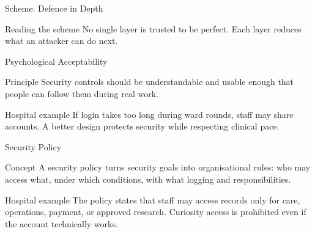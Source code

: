 \documentclass[presentation]{beamer}
\begin{document}
\begin{frame}[c]{Scheme: Defence in Depth}
\begin{center}
\end{center}

\begin{block}{Reading the scheme}
No single layer is trusted to be perfect. Each layer reduces what an attacker can do next.
\end{block}
\end{frame}

\begin{frame}[c]{Psychological Acceptability}
\begin{block}{Principle}
Security controls should be understandable and usable enough that people can follow them during
real work.
\end{block}

\begin{exampleblock}{Hospital example}
If login takes too long during ward rounds, staff may share accounts. A better design protects
security while respecting clinical pace.
\end{exampleblock}
\end{frame}

\begin{frame}[c]{Security Policy}
\begin{block}{Concept}
A security policy turns security goals into organisational rules: who may access what, under
which conditions, with what logging and responsibilities.
\end{block}

\begin{exampleblock}{Hospital example}
The policy states that staff may access records only for care, operations, payment, or approved
research. Curiosity access is prohibited even if the account technically works.
\end{exampleblock}
\end{frame}
\end{document}
